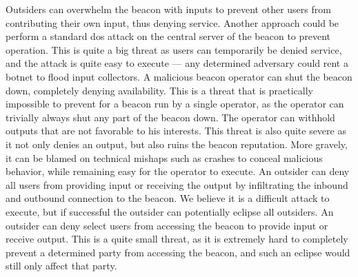  Outsiders can overwhelm the beacon with inputs to prevent other users from contributing their own input, thus denying service. Another approach could be perform a standard \gls{dos} attack on the central server of the beacon to prevent operation. This is quite a big threat as users can temporarily be denied service, and the attack is quite easy to execute --- any determined adversary could rent a botnet to flood input collectors.    %
 A malicious beacon operator can shut the beacon down, completely denying availability. This is a threat that is practically impossible to prevent for a beacon run by a single operator, as the operator can trivially always shut any part of the beacon down.
 The operator can withhold outputs that are not favorable to his interests. This threat is also quite severe as it not only denies an output, but also ruins the beacon reputation. More gravely, it can be blamed on technical mishaps such as crashes to conceal malicious behavior, while remaining easy for the operator to execute.
 An outsider can deny all users from providing input or receiving the output by infiltrating the inbound and outbound connection to the beacon. We believe it is a difficult attack to execute, but if successful the outsider can potentially eclipse all outsiders.
 An outsider can deny select users from accessing the beacon to provide input or receive output. This is a quite small threat, as it is extremely hard to completely prevent a determined party from accessing the beacon, and such an eclipse would still only affect that party.

